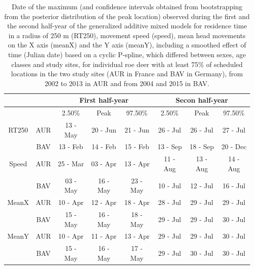 \documentclass[a4paper,11pt]{article}
\begin{document}
\newpage
\begin{table}[t]
  \centering
  \caption{Date of the maximum (and confidence intervals obtained from bootstrapping from the posterior distribution of the peak location) observed during the first and the second half-year of the generalized additive
    mixed models for residence time in a radius of 250 m (RT250),
    movement speed (speed), mean head movements on the X axis (meanX)
    and the Y axis (meanY), including a smoothed effect of time
    (Julian date) based on a cyclic P-spline, which differed between sexes, age classes and study sites, for individual roe deer with at least 75\% of scheduled locations in the two study sites (AUR in France and BAV in Germany), from 2002
    to 2013 in AUR and from 2004 and 2015 in BAV.}    \label{tab:peaks}
    
    \begin{tabular}{cccccccc}
    \\
    \hline
          &       & \multicolumn{3}{c}{First half-year} & \multicolumn{3}{c}{Secon half-year} \\
    \hline
          &       & 2.50\% & Peak  & 97.50\% & 2.50\% & Peak  & 97.50\% \\
    RT250 & AUR   & 13 - May & 20 - Jun & 21 - Jun & 26 - Jul & 26 - Jul & 27 - Jul \\
          & BAV   & 13 - Feb & 14 - Feb & 15 - Feb & 13 - Sep & 18 - Sep & 20 - Dec \\
    Speed & AUR   & 25 - Mar & 03 - Apr & 13 - Apr & 11 - Aug & 13 - Aug & 14 - Aug       \\
          & BAV   & 03 - May & 16 - May & 23 - May & 10 - Jul & 12 - Jul & 16 - Jul \\
    MeanX & AUR   & 10 - Apr & 12 - Apr & 18 - Apr & 28 - Jul & 29 - Jul & 29 - Jul \\
          & BAV   & 15 - May & 16 - May & 18 - May & 29 - Jul & 29 - Jul & 30 - Jul \\
    MeanY & AUR   & 10 - Apr & 11 - Apr & 13 - Apr & 29 - Jul & 29 - Jul & 30 - Jul \\
          & BAV   & 15 - May & 16 - May & 17 - May & 29 - Jul & 30 - Jul & 30 - Jul \\
    \hline
    \end{tabular}
\end{table}

\end{document}
